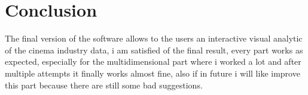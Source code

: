 \documentclass[]{article}
\begin{document}
\section{Conclusion}
The final version of the software allows to the users an interactive visual analytic of the cinema industry data, i am satisfied of the final result, every part works as expected, especially for the multidimensional part where i worked a lot and after multiple attempts it finally works almost fine, also if in future i will like improve this part because there are still some bad suggestions.
\end{document}
